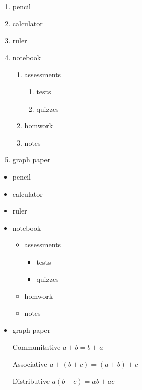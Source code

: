 \documentclass[11pt]{article}
\begin{document}
\begin{enumerate}

\item pencil
\item calculator
\item ruler
\item notebook
     \begin{enumerate}
     \item assessments
          \begin{enumerate}
          \item tests
          \item quizzes
          \end{enumerate}
     \item homwork
     \item notes
     \end{enumerate}
\item graph paper

\end{enumerate}

\begin{itemize}

\item pencil
\item calculator
\item ruler
\item notebook
     \begin{itemize}
     \item assessments
          \begin{itemize}
          \item tests
          \item quizzes
          \end{itemize}
     \item homwork
     \item notes
     \end{itemize}
\item graph paper

\end{itemize}

\begin{enumerate}
\item[Communitative] $a+b=b+a$
\item[Associative] $a+(b+c)=(a+b)+c$
\item[Distributive] $a(b+c)= ab+ac$
\end{enumerate}
\end{document}
